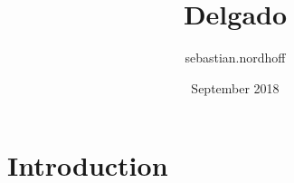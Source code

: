 \documentclass{article}
\title{Delgado}
\author{sebastian.nordhoff }
\date{September 2018}
\begin{document}
\maketitle

\section{Introduction}
\end{document}
